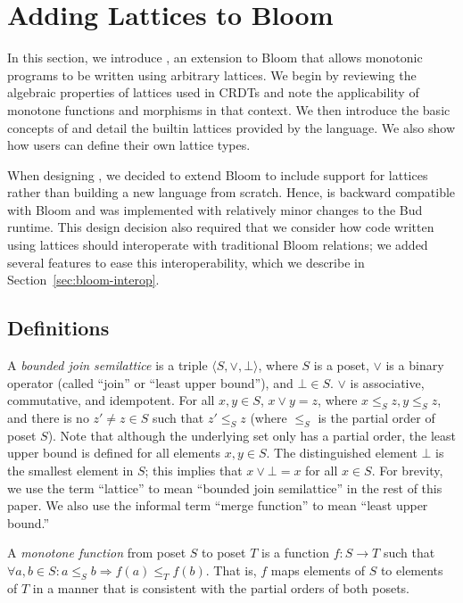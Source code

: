 \section{Adding Lattices to Bloom}
\label{sec:lang}

In this section, we introduce \lang, an extension to Bloom that allows monotonic
programs to be written using arbitrary lattices. We begin by reviewing the
algebraic properties of lattices used in CRDTs and note the applicability of
monotone functions and morphisms in that context. We then introduce the basic
concepts of \lang and detail the builtin lattices provided by the language. We
also show how users can define their own lattice types.

When designing \lang, we decided to extend Bloom to include support for lattices
rather than building a new language from scratch. Hence, \lang is backward
compatible with Bloom and was implemented with relatively minor changes to the
Bud runtime. This design decision also required that we consider how code
written using lattices should interoperate with traditional Bloom relations; we
added several \lang features to ease this interoperability, which we describe in
Section~\ref{sec:bloom-interop}.

\subsection{Definitions}
\label{sec:lattice-defn}
A \emph{bounded join semilattice} is a triple $\langle S, \lor, \bot\rangle$,
where $S$ is a poset, $\lor$ is a binary operator (called ``join'' or ``least
upper bound''), and $\bot \in S$. $\lor$ is associative, commutative, and
idempotent. For all $x, y \in S$, $x \lor y = z$, where $x \leq_S z, y \leq_S
z$, and there is no $z' \ne z \in S$ such that $z' \leq_S z$ (where $\leq_S$ is
the partial order of poset $S$). Note that although the underlying set only has
a partial order, the least upper bound is defined for all elements $x,y \in
S$. The distinguished element $\bot$ is the smallest element in $S$; this
implies that $x \lor \bot = x$ for all $x \in S$. For brevity, we use the term
``lattice'' to mean ``bounded join semilattice'' in the rest of this paper. We
also use the informal term ``merge function'' to mean ``least upper bound.''

A \emph{monotone function} from poset $S$ to poset $T$ is a function $f: S \to
T$ such that $\forall a,b \in S: a \leq_S b \Rightarrow f(a) \leq_T f(b)$. That
is, $f$ maps elements of $S$ to elements of $T$ in a manner that is consistent
with the partial orders of both posets.

